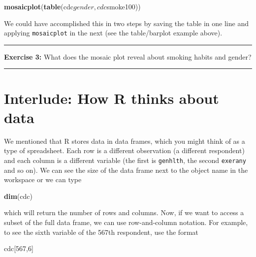 \documentclass[]{book}
\newenvironment{Shaded}{\begin{snugshade}}{\end{snugshade}}
\newcommand{\KeywordTok}[1]{\textcolor[rgb]{0.13,0.29,0.53}{\textbf{{#1}}}}
\newcommand{\DecValTok}[1]{\textcolor[rgb]{0.00,0.00,0.81}{{#1}}}
\newcommand{\NormalTok}[1]{{#1}}
\theoremstyle{definition}
\theoremstyle{definition}
\theoremstyle{definition}
\theoremstyle{remark}
\begin{document}
\begin{Shaded}
\begin{Highlighting}[]
\KeywordTok{mosaicplot}\NormalTok{(}\KeywordTok{table}\NormalTok{(cdc$gender,cdc$smoke100))}
\end{Highlighting}
\end{Shaded}

We could have accomplished this in two steps by saving the table in one
line and applying \texttt{mosaicplot} in the next (see the table/barplot
example above).

\begin{center}\rule{0.5\linewidth}{\linethickness}\end{center}

\textbf{Exercise 3:} What does the mosaic plot reveal about smoking
habits and gender?

\begin{center}\rule{0.5\linewidth}{\linethickness}\end{center}

\section{Interlude: How R thinks about
data}\label{interlude-how-r-thinks-about-data}

We mentioned that R stores data in data frames, which you might think of
as a type of spreadsheet. Each row is a different observation (a
different respondent) and each column is a different variable (the first
is \texttt{genhlth}, the second \texttt{exerany} and so on). We can see
the size of the data frame next to the object name in the workspace or
we can type

\begin{Shaded}
\begin{Highlighting}[]
\KeywordTok{dim}\NormalTok{(cdc)}
\end{Highlighting}
\end{Shaded}

which will return the number of rows and columns. Now, if we want to
access a subset of the full data frame, we can use row-and-column
notation. For example, to see the sixth variable of the 567th
respondent, use the format

\begin{Shaded}
\begin{Highlighting}[]
\NormalTok{cdc[}\DecValTok{567}\NormalTok{,}\DecValTok{6}\NormalTok{]}
\end{Highlighting}
\end{Shaded}
\end{document}
